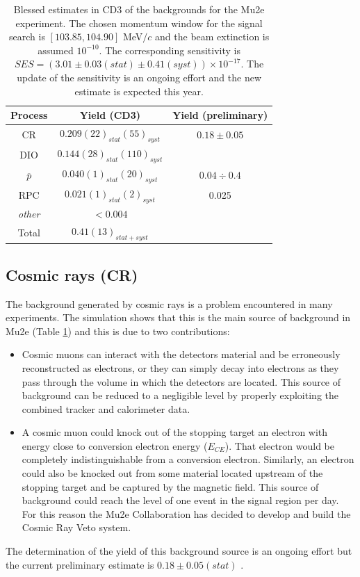 \documentclass[12pt,a4paper,openright, oneside, titlepage]{book} %
\begin{document}
\begin{table}
\centering
\begin{tabular}{|c|c|c|}
\hline
Process & Yield (CD3) & Yield (preliminary)\\
\hline
\hline
CR	&	$0.209(22)_{stat}(55)_{syst}$ & $0.18\pm0.05$ \cite{CRV_now}\\
\hline
DIO	&	$0.144(28)_{stat}(110)_{syst}$ & \\
\hline
$\overline{p}$	&	$0.040(1)_{stat}(20)_{syst}$ &$0.04 \div 0.4$ \cite{Giovanni:2020}\\
\hline
RPC	&	$0.021(1)_{stat}(2)_{syst}$	& 0.025 \cite{RPC_now} \\
\hline
\textit{other}	& $< 0.004$ &\\
\hline
\hline
Total &	$0.41(13)_{stat+syst}$ &\\
\hline
\end{tabular}
\caption[Mu2e background]{Blessed estimates in CD3 \cite{CD3} of the backgrounds for the Mu2e experiment.
The chosen momentum window for the signal search is $[103.85, 104.90]$ MeV$/c$ and the beam extinction is assumed $10^{-10}$. 
The corresponding sensitivity is $SES=(3.01 \pm 0.03(stat) \pm 0.41(syst)) \times 10^{-17}$. 
The update of the sensitivity is an ongoing effort and the new estimate is expected this year.}
\label{T_backgrounds}
\end{table}

\subsection{Cosmic rays (CR)}
The background generated by cosmic rays is a problem encountered in many experiments.
The simulation shows that this is the main source of background in Mu2e (Table \ref{T_backgrounds})
and this is due to two contributions:

\begin{itemize}
\item Cosmic muons can interact with the detectors material and be erroneously reconstructed as electrons, or they can simply decay into electrons as they pass through the volume in which the detectors are located. 
This source of background can be reduced to a negligible level by properly exploiting the combined tracker and calorimeter data.
\item A cosmic muon could knock out of the stopping target an electron with energy close to conversion electron energy ($E_{CE}$). 
That electron would be completely indistinguishable from a conversion electron. 
Similarly, an electron could also be knocked out from some material located upstream of the stopping target and be captured by the magnetic field. 
This source of background could reach the level of one event in the signal region per day.
For this reason the Mu2e Collaboration has decided to develop and build the Cosmic Ray Veto system.
\end{itemize}
The determination of the yield of this background source is an ongoing effort but the current preliminary estimate is $0.18\pm0.05(stat)$ \cite{CRV_now}.
\end{document}
